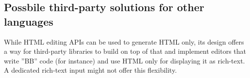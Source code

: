 \subsection{Possbile third-party solutions for other languages}
\label{subsec:edit_api_adv_thir_party_lang}

While HTML editing APIs can be used to generate HTML only, its design offers a way for third-party libraries to build on top of that and implement editors that write ''BB'' code (for instance) and use HTML only for displaying it as rich-text. A dedicated rich-text input might not offer this flexibility.